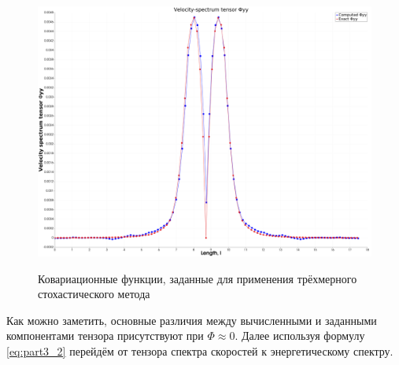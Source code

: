 \begin{figure}[!ht]
{         
        {\includegraphics[width=0.45\linewidth]{images/kriging/3components/phi_22_diagonal.png}} \\
    }
    
    \caption{Ковариационные функции, заданные для применения трёхмерного стохастического метода}
    \label{img:exact_covariance_comparison_heat_maps_for_3d}  
\end{figure}

Как можно заметить, основные различия между вычисленными и заданными компонентами тензора присутствуют при $\Phi \approx 0$. Далее используя формулу \eqref{eq:part3_2} перейдём от тензора спектра скоростей к энергетическому спектру. 


